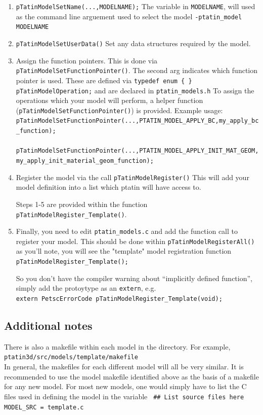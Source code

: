 \documentclass[paper=a4, fontsize=11pt,twoside]{scrartcl}
\newcommand{\shellcmd}[1]{\\\indent\indent\texttt{\hspace{5mm}\footnotesize #1}\\}
\newcommand{\unix}[1]{\texttt{\footnotesize #1}}
\begin{document}
{{\begin{enumerate}
	\item \unix{pTatinModelSetName(...,MODELNAME);}
The variable in \unix{MODELNAME}, will used as the command line arguement used to select the model
	\unix{-ptatin\_model MODELNAME}

	\item \unix{pTatinModelSetUserData()}
Set any data structures required by the model.

	\item Assign the function pointers. This is done via \unix{pTatinModelSetFunctionPointer()}.
The second arg indicates which function pointer is used. These are defined via
\unix{typedef enum \{ \} pTatinModelOperation;}
and are declared in 
\unix{ptatin\_models.h}
To assign the operations which your model will perform, a helper function (\unix{pTatinModelSetFunctionPointer()}) is provided.
Example usage:
\shellcmd{pTatinModelSetFunctionPointer(...,PTATIN\_MODEL\_APPLY\_BC,my\_apply\_bc\_function);}
\shellcmd{pTatinModelSetFunctionPointer(...,PTATIN\_MODEL\_APPLY\_INIT\_MAT\_GEOM,my\_apply\_init\_material\_geom\_function);}

	\item Register the model via the call
\unix{pTatinModelRegister()}
This will add your model definition into a list which ptatin will have access to.

Steps 1-5 are provided within the function \unix{pTatinModelRegister\_Template()}.

	\item Finally, you need to edit
	\unix{ptatin\_models.c}
and add the function call to register your model.
This should be done within
		\unix{pTatinModelRegisterAll()}
as you'll note, you will see the "template" model registration function 	
		\unix{pTatinModelRegister\_Template();}

So you don't have the compiler warning about ``implicitly defined function'', simply add the protoytype as an \unix{extern}, e.g.
	\shellcmd{extern PetscErrorCode pTatinModelRegister\_Template(void);}
\end{enumerate}

\subsection{Additional notes}
There is also a makefile within each model in the directory.
For example,
	\shellcmd{ptatin3d/src/models/template/makefile}
In general, the makefiles for each different model will all be very similar.
It is recommended to use the model makefile identified above as the basis of a makefile for any new model.
For most new models, one would simply have to list the C files used in defining the model in the variable
\newline
\unix{
\#\# List source files here \newline
MODEL\_SRC = \newline
        template.c \newline
}

}}
\end{document}
